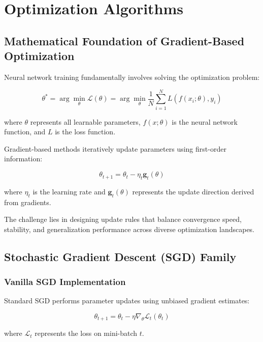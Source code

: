 \documentclass[11pt,a4paper]{report}
\begin{document}
\section{Optimization Algorithms}

\subsection{Mathematical Foundation of Gradient-Based Optimization}

Neural network training fundamentally involves solving the optimization problem:

\begin{equation}
\theta^* = \arg\min_\theta \mathcal{L}(\theta) = \arg\min_\theta \frac{1}{N}\sum_{i=1}^N L(f(x_i; \theta), y_i)
\end{equation}

where $\theta$ represents all learnable parameters, $f(x; \theta)$ is the neural network function, and $L$ is the loss function.

Gradient-based methods iteratively update parameters using first-order information:

\begin{equation}
\theta_{t+1} = \theta_t - \eta_t \mathbf{g}_t(\theta)
\end{equation}

where $\eta_t$ is the learning rate and $\mathbf{g}_t(\theta)$ represents the update direction derived from gradients.

The challenge lies in designing update rules that balance convergence speed, stability, and generalization performance across diverse optimization landscapes.

\subsection{Stochastic Gradient Descent (SGD) Family}

\subsubsection{Vanilla SGD Implementation}

Standard SGD performs parameter updates using unbiased gradient estimates:

\begin{equation}
\theta_{t+1} = \theta_t - \eta \nabla_\theta \mathcal{L}_t(\theta_t)
\end{equation}

where $\mathcal{L}_t$ represents the loss on mini-batch $t$.
\end{document}
